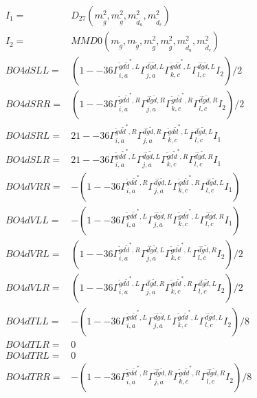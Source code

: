 \documentclass[A4,landscape]{article}
\begin{document}
\begin{align} 
I_1 = & D_{27}(m^2_{\tilde{g}}, m^2_{\tilde{g}}, m^2_{\tilde{d}_{{a}}}, m^2_{\tilde{d}_{{c}}}) \\ 
I_2 = & MMD0(m_{\tilde{g}}, m_{\tilde{g}}, m^2_{\tilde{g}}, m^2_{\tilde{g}}, m^2_{\tilde{d}_{{a}}}, m^2_{\tilde{d}_{{c}}}) \\ 
  BO4dSLL= & (1
--
36 \Gamma^{\tilde{g} d \tilde{d}^*,L}_{i, a} \Gamma^{\bar{d}\tilde{g} \tilde{d} ,L}_{j, a} \Gamma^{\tilde{g} d \tilde{d}^*,L}_{k, c} \Gamma^{\bar{d}\tilde{g} \tilde{d} ,L}_{l, c} I_2)/2 \\ 
  BO4dSRR= & (1
--
36 \Gamma^{\tilde{g} d \tilde{d}^*,R}_{i, a} \Gamma^{\bar{d}\tilde{g} \tilde{d} ,R}_{j, a} \Gamma^{\tilde{g} d \tilde{d}^*,R}_{k, c} \Gamma^{\bar{d}\tilde{g} \tilde{d} ,R}_{l, c} I_2)/2 \\ 
  BO4dSRL= & 2 1
--
36 \Gamma^{\tilde{g} d \tilde{d}^*,R}_{i, a} \Gamma^{\bar{d}\tilde{g} \tilde{d} ,R}_{j, a} \Gamma^{\tilde{g} d \tilde{d}^*,L}_{k, c} \Gamma^{\bar{d}\tilde{g} \tilde{d} ,L}_{l, c} I_1 \\ 
  BO4dSLR= & 2 1
--
36 \Gamma^{\tilde{g} d \tilde{d}^*,L}_{i, a} \Gamma^{\bar{d}\tilde{g} \tilde{d} ,L}_{j, a} \Gamma^{\tilde{g} d \tilde{d}^*,R}_{k, c} \Gamma^{\bar{d}\tilde{g} \tilde{d} ,R}_{l, c} I_1 \\ 
  BO4dVRR= & -(1
--
36 \Gamma^{\tilde{g} d \tilde{d}^*,R}_{i, a} \Gamma^{\bar{d}\tilde{g} \tilde{d} ,L}_{j, a} \Gamma^{\tilde{g} d \tilde{d}^*,R}_{k, c} \Gamma^{\bar{d}\tilde{g} \tilde{d} ,L}_{l, c} I_1) \\ 
  BO4dVLL= & -(1
--
36 \Gamma^{\tilde{g} d \tilde{d}^*,L}_{i, a} \Gamma^{\bar{d}\tilde{g} \tilde{d} ,R}_{j, a} \Gamma^{\tilde{g} d \tilde{d}^*,L}_{k, c} \Gamma^{\bar{d}\tilde{g} \tilde{d} ,R}_{l, c} I_1) \\ 
  BO4dVRL= & (1
--
36 \Gamma^{\tilde{g} d \tilde{d}^*,R}_{i, a} \Gamma^{\bar{d}\tilde{g} \tilde{d} ,L}_{j, a} \Gamma^{\tilde{g} d \tilde{d}^*,L}_{k, c} \Gamma^{\bar{d}\tilde{g} \tilde{d} ,R}_{l, c} I_2)/2 \\ 
  BO4dVLR= & (1
--
36 \Gamma^{\tilde{g} d \tilde{d}^*,L}_{i, a} \Gamma^{\bar{d}\tilde{g} \tilde{d} ,R}_{j, a} \Gamma^{\tilde{g} d \tilde{d}^*,R}_{k, c} \Gamma^{\bar{d}\tilde{g} \tilde{d} ,L}_{l, c} I_2)/2 \\ 
  BO4dTLL= & -(1
--
36 \Gamma^{\tilde{g} d \tilde{d}^*,L}_{i, a} \Gamma^{\bar{d}\tilde{g} \tilde{d} ,L}_{j, a} \Gamma^{\tilde{g} d \tilde{d}^*,L}_{k, c} \Gamma^{\bar{d}\tilde{g} \tilde{d} ,L}_{l, c} I_2)/8 \\ 
  BO4dTLR= & 0 \\ 
  BO4dTRL= & 0 \\ 
  BO4dTRR= & -(1
--
36 \Gamma^{\tilde{g} d \tilde{d}^*,R}_{i, a} \Gamma^{\bar{d}\tilde{g} \tilde{d} ,R}_{j, a} \Gamma^{\tilde{g} d \tilde{d}^*,R}_{k, c} \Gamma^{\bar{d}\tilde{g} \tilde{d} ,R}_{l, c} I_2)/8 \\ 
\end{align} 
\end{document}
